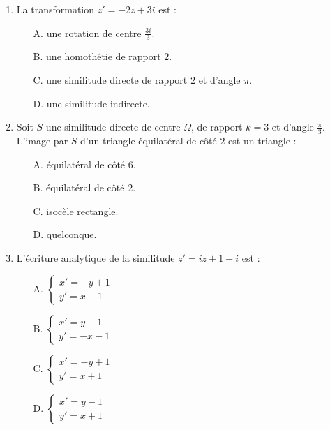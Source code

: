 \documentclass[11pt]{article}
\begin{document}
\begin{exercice}
\begin{enumerate}
    \item La transformation $z' = -2z + 3i$ est :
    \begin{itemize}
        \item[A.] une rotation de centre $\frac{3i}{3}$.
        \item[B.] une homothétie de rapport $2$.
        \item[C.] une similitude directe de rapport $2$ et d'angle $\pi$.
        \item[D.] une similitude indirecte.
    \end{itemize}
    \item Soit $S$ une similitude directe de centre $\Omega$, de rapport $k=3$ et d'angle $\frac{\pi}{3}$. L'image par $S$ d'un triangle équilatéral de côté $2$ est un triangle :
    \begin{itemize}
        \item[A.] équilatéral de côté $6$.
        \item[B.] équilatéral de côté $2$.
        \item[C.] isocèle rectangle.
        \item[D.] quelconque.
    \end{itemize}
    \item L'écriture analytique de la similitude $z' = i z + 1 - i$ est :
    \begin{itemize}
        \item[A.] $\begin{cases} x' = -y + 1 \\ y' = x - 1 \end{cases}$
        \item[B.] $\begin{cases} x' = y + 1 \\ y' = -x - 1 \end{cases}$
        \item[C.] $\begin{cases} x' = -y + 1 \\ y' = x + 1 \end{cases}$
        \item[D.] $\begin{cases} x' = y - 1 \\ y' = x + 1 \end{cases}$
    \end{itemize}
\end{enumerate}
\end{exercice}
\end{document}

